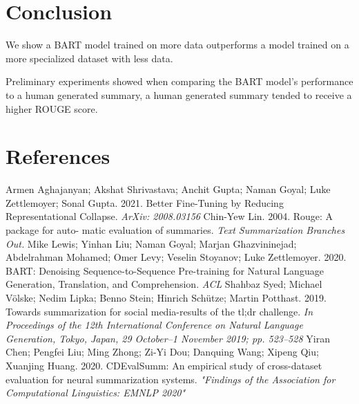\documentclass[11pt,a4paper, twocolumn]{article}
\begin{document}
\section{Conclusion}
We show a BART model trained on more data outperforms a model trained on a more specialized dataset with less data. 

Preliminary experiments showed when comparing the BART model's performance to a human generated summary, a human generated summary tended to receive a higher ROUGE score. 

\section*{References}
 \noindent Armen Aghajanyan; Akshat Shrivastava; Anchit Gupta; Naman Goyal; Luke Zettlemoyer; Sonal Gupta. 2021. Better Fine-Tuning by Reducing Representational Collapse. \emph{ArXiv: 2008.03156}
 \bigbreak
\noindent Chin-Yew Lin. 2004. Rouge: A package for auto-
matic evaluation of summaries. \emph{Text Summarization
Branches Out.}
\bigbreak
\noindent Mike Lewis; Yinhan Liu; Naman Goyal; Marjan Ghazvininejad; Abdelrahman Mohamed; Omer Levy; Veselin Stoyanov; Luke Zettlemoyer. 2020. BART: Denoising Sequence-to-Sequence Pre-training for Natural Language Generation, Translation, and Comprehension. \emph{ACL}
\bigbreak
\noindent Shahbaz Syed; Michael Völske; Nedim Lipka; Benno Stein; Hinrich Schütze; Martin Potthast. 2019. Towards summarization for social media-results of the tl;dr
challenge. \emph{In Proceedings of the 12th International Conference on Natural Language Generation, Tokyo, Japan, 29 October–1
November 2019; pp. 523–528}
\bigbreak
\noindent Yiran Chen; Pengfei Liu; Ming Zhong; Zi-Yi Dou; Danquing Wang; Xipeng Qiu; Xuanjing Huang. 2020. CDEvalSumm: An empirical study of cross-dataset evaluation
for neural summarization systems. \emph{"Findings of the Association for Computational Linguistics: EMNLP 2020"}
\end{document}

